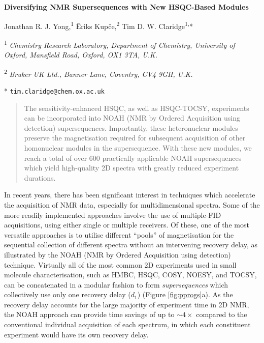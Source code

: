 \documentclass[11pt]{article}
\newcommand*{\proton}{\ce{^{1}H}}
\newcommand*{\figref}[1]{Figure \ref{fig:#1}}
\begin{document}
\begin{center}
    \Large \textbf{Diversifying NMR Supersequences with New HSQC-Based Modules}

    \vspace{0.2cm}

    \large Jonathan R. J. Yong,\textsuperscript{1} {\=E}riks Kup{\v{c}}e,\textsuperscript{2} Tim D. W. Claridge\textsuperscript{1,}*

    \vspace{0.2cm}

    \normalsize

    \textsuperscript{1} \textit{Chemistry Research Laboratory, Department of Chemistry, University of Oxford, Mansfield Road, Oxford, OX1 3TA, U.K.}

    \textsuperscript{2} \textit{Bruker UK Ltd., Banner Lane, Coventry, CV4 9GH, U.K.}

    * \texttt{tim.claridge@chem.ox.ac.uk}
\end{center}
\vspace{0.5cm}
\begin{abstract}
    The sensitivity-enhanced HSQC, as well as HSQC-TOCSY, experiments can be incorporated into NOAH (NMR by Ordered Acquisition using \proton{} detection) supersequences.
    Importantly, these heteronuclear modules preserve the magnetisation required for subsequent acquisition of other homonuclear modules in the supersequence.
    With these new modules, we reach a total of over 600 practically applicable NOAH supersequences which yield high-quality 2D spectra with greatly reduced experiment durations.
\end{abstract}

In recent years, there has been significant interest in techniques which accelerate the acquisition of NMR data, especially for multidimensional spectra.\autocite{ultrafast, timeshared, multireceive}
Some of the more readily implemented approaches involve the use of multiple-FID acquisitions, using either single or multiple receivers.
Of these, one of the most versatile approaches is to utilise different ``pools'' of magnetisation for the sequential collection of different spectra without an intervening recovery delay, as illustrated by the NOAH (NMR by Ordered Acquisition using \proton{} detection) technique.\autocite{noah}
Virtually all of the most common 2D experiments used in small molecule characterisation, such as HMBC, HSQC, COSY, NOESY, and TOCSY, can be concatenated in a modular fashion to form \textit{supersequences} which collectively use only one recovery delay ($d_1$) (\figref{pprogs}a).
As the recovery delay accounts for the large majority of experiment time in 2D NMR, the NOAH approach can provide time savings of up to $\sim 4\times$ compared to the conventional individual acquisition of each spectrum, in which each constituent experiment would have its own recovery delay.
\end{document}
